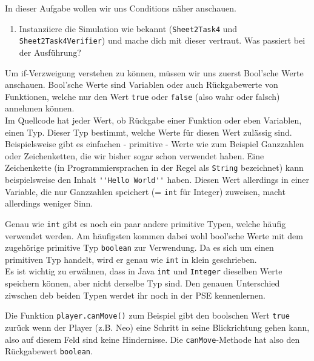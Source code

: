 

In dieser Aufgabe wollen wir uns Conditions näher anschauen.

\begin{enumerate}                           
    \item Instanziiere die Simulation wie bekannt (\lstinline{Sheet2Task4} und \lstinline{Sheet2Task4Verifier}) und mache dich mit dieser vertraut.
        Was passiert bei der Ausführung?
\end{enumerate}

\begin{Infobox}
    Um if-Verzweigung verstehen zu können, müssen wir uns zuerst Bool'sche Werte anschauen. Bool'sche Werte sind Variablen oder auch Rückgabewerte von Funktionen, welche nur den Wert \lstinline{true} oder \lstinline{false} (also wahr oder falsch) annehmen können. \\
    Im Quellcode hat jeder Wert, ob Rückgabe einer Funktion oder eben Variablen, einen Typ.
    Dieser Typ bestimmt, welche Werte für diesen Wert zulässig sind.
    Beispielsweise gibt es einfachen - primitive - Werte wie zum Beispiel Ganzzahlen oder Zeichenketten, die wir bisher sogar schon verwendet haben.
    Eine Zeichenkette (in Programmiersprachen in der Regel als \lstinline{String} bezeichnet) kann beispielsweise den Inhalt \lstinline{''Hello World''} haben.
    Diesen Wert allerdings in einer Variable, die nur Ganzzahlen speichert (= \lstinline{int} für Integer) zuweisen, macht allerdings weniger Sinn.
    
    Genau wie \lstinline{int} gibt es noch ein paar andere primitive Typen, welche häufig verwendet werden.
    Am häufigsten kommen dabei wohl bool'sche Werte mit dem zugehörige primitive Typ \lstinline{boolean} zur Verwendung.
    Da es sich um einen primitiven Typ handelt, wird er genau wie \lstinline{int} in klein geschrieben.\\
    
    Es ist wichtig zu erwähnen, dass in Java \lstinline{int} und \lstinline{Integer} dieselben Werte speichern können, aber nicht derselbe Typ sind.
    Den genauen Unterschied ziwschen deb beiden Typen werdet ihr noch in der PSE kennenlernen.
    
    Die Funktion \lstinline{player.canMove()} zum Beispiel gibt den boolschen Wert \lstinline{true} zurück wenn der Player (z.B. Neo) eine Schritt in seine Blickrichtung gehen kann, also auf diesem Feld sind keine Hindernisse.
    Die \lstinline{canMove}-Methode hat also den Rückgabewert \lstinline{boolean}.
    
\end{Infobox}

